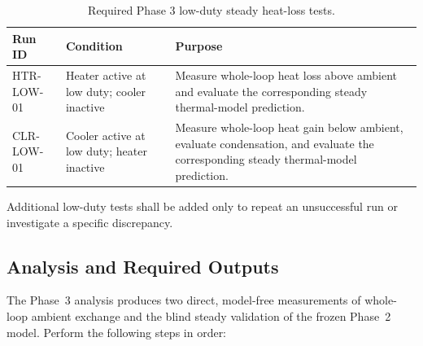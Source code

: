\documentclass[11pt]{article}
\begin{document}
\begin{table}[htbp]
    \centering
    \caption{Required Phase 3 low-duty steady heat-loss tests.}
    \label{tab:phase3_runs}
    \begin{tabularx}{\textwidth}{
        @{}
        >{\raggedright\arraybackslash}p{1.25in}
        >{\raggedright\arraybackslash}p{1.75in}
        >{\raggedright\arraybackslash}X
        @{}
    }
        \toprule
        \textbf{Run ID} &
        \textbf{Condition} &
        \textbf{Purpose} \\
        \midrule

        HTR-LOW-01 &
        Heater active at low duty; cooler inactive &
        Measure whole-loop heat loss above ambient and evaluate the corresponding steady thermal-model prediction. \\

        CLR-LOW-01 &
        Cooler active at low duty; heater inactive &
        Measure whole-loop heat gain below ambient, evaluate condensation, and evaluate the corresponding steady thermal-model prediction. \\

        \bottomrule
    \end{tabularx}
\end{table}

Additional low-duty tests shall be added only to repeat an unsuccessful run or investigate a specific discrepancy.

\subsection{Analysis and Required Outputs}

The Phase~3 analysis produces two direct, model-free measurements of whole-loop ambient exchange and the blind steady validation of the frozen Phase~2 model. Perform the following steps in order:
\end{document}
